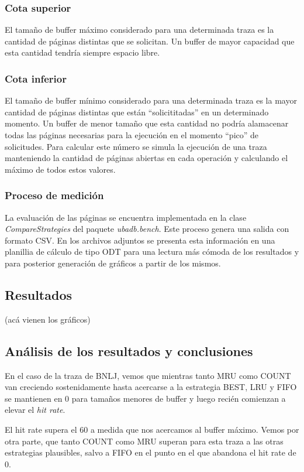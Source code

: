 \subsubsection*{Cota superior}
El tama\~no de buffer m\'aximo considerado para una determinada traza es la cantidad de p\'aginas distintas que se solicitan. Un buffer
de mayor capacidad que esta cantidad tendr\'ia siempre espacio libre.  

\subsubsection*{Cota inferior}
El tama\~no de buffer m\'inimo considerado para una determinada traza es la mayor cantidad de p\'aginas distintas que est\'an ``solicititadas''
en un determinado momento. Un buffer de menor tama\~no que esta cantidad no podr\'ia alamacenar todas las p\'aginas necesarias para la ejecuci\'on 
en el momento ``pico'' de solicitudes. Para calcular este n\'umero se simula la ejecuci\'on de una traza manteniendo la cantidad de p\'aginas abiertas
en cada operaci\'on y calculando el m\'aximo de todos estos valores. 

\subsubsection{Proceso de medici\'on}
La evaluaci\'on de las p\'aginas se encuentra implementada en la clase \textit{CompareStrategies} del paquete \textit{ubadb.bench}. 
Este proceso genera una salida con formato CSV. En los archivos adjuntos se presenta esta informaci\'on en una planillia de 
c\'alculo de tipo ODT para una lectura m\'as c\'omoda de los resultados y para posterior generaci\'on de gr\'aficos a partir de 
los mismos.

\subsection{Resultados}

(ac\'a vienen los gr\'aficos)

\subsection{An\'alisis de los resultados y conclusiones}
En el caso de la traza de BNLJ, vemos que mientras tanto MRU como COUNT van creciendo sostenidamente hasta acercarse a la estrategia 
BEST, LRU y FIFO se mantienen en 0 para tama\~nos menores de buffer y luego reci\'en comienzan a elevar el \textit{hit rate}.

El hit rate supera el 60 a medida que nos acercamos al buffer m\'aximo. Vemos por otra parte, que tanto COUNT como MRU 
superan para esta traza a las otras estrategias plausibles, salvo a FIFO en el punto en el que abandona el hit rate de 0.